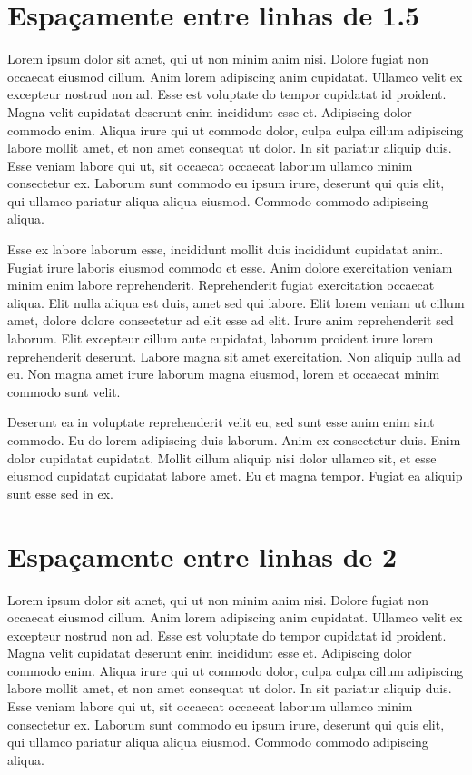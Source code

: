 \documentclass{article}
\begin{document}
\section{Espaçamente entre linhas de 1.5}

\onehalfspacing

Lorem ipsum dolor sit amet, qui ut non minim anim nisi. Dolore fugiat
non occaecat eiusmod cillum.
Anim lorem adipiscing anim cupidatat. Ullamco velit ex excepteur
nostrud non ad. Esse est voluptate do tempor cupidatat id proident.
Magna velit cupidatat deserunt enim incididunt esse et. Adipiscing
dolor commodo enim.
Aliqua irure qui ut commodo dolor, culpa culpa cillum adipiscing
labore mollit amet, et non amet consequat ut dolor.
In sit pariatur aliquip duis. Esse veniam labore qui ut, sit occaecat
occaecat laborum ullamco minim consectetur ex.
Laborum sunt commodo eu ipsum irure, deserunt qui quis elit, qui
ullamco pariatur aliqua aliqua eiusmod. Commodo commodo adipiscing aliqua.

Esse ex labore laborum esse, incididunt mollit duis incididunt
cupidatat anim. Fugiat irure laboris eiusmod commodo et esse. Anim
dolore exercitation veniam minim enim labore reprehenderit.
Reprehenderit fugiat exercitation occaecat aliqua. Elit nulla aliqua
est duis, amet sed qui labore.
Elit lorem veniam ut cillum amet, dolore dolore consectetur ad elit
esse ad elit. Irure anim reprehenderit sed laborum.
Elit excepteur cillum aute cupidatat, laborum proident irure lorem
reprehenderit deserunt. Labore magna sit amet exercitation.
Non aliquip nulla ad eu. Non magna amet irure laborum magna eiusmod,
lorem et occaecat minim commodo sunt velit.

Deserunt ea in voluptate reprehenderit velit eu, sed sunt esse anim
enim sint commodo.
Eu do lorem adipiscing duis laborum. Anim ex consectetur duis. Enim
dolor cupidatat cupidatat.
Mollit cillum aliquip nisi dolor ullamco sit, et esse eiusmod
cupidatat cupidatat labore amet. Eu et magna tempor.
Fugiat ea aliquip sunt esse sed in ex.

\section{Espaçamente entre linhas de 2}

\doublespacing

Lorem ipsum dolor sit amet, qui ut non minim anim nisi. Dolore fugiat
non occaecat eiusmod cillum.
Anim lorem adipiscing anim cupidatat. Ullamco velit ex excepteur
nostrud non ad. Esse est voluptate do tempor cupidatat id proident.
Magna velit cupidatat deserunt enim incididunt esse et. Adipiscing
dolor commodo enim.
Aliqua irure qui ut commodo dolor, culpa culpa cillum adipiscing
labore mollit amet, et non amet consequat ut dolor.
In sit pariatur aliquip duis. Esse veniam labore qui ut, sit occaecat
occaecat laborum ullamco minim consectetur ex.
Laborum sunt commodo eu ipsum irure, deserunt qui quis elit, qui
ullamco pariatur aliqua aliqua eiusmod. Commodo commodo adipiscing aliqua.
\end{document}
